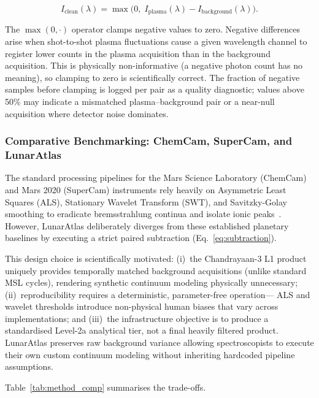 \documentclass[a4paper,twocolumn,10pt]{article}
\begin{document}
\begin{equation}
\label{eq:subtraction}
I_{\text{clean}}(\lambda) =
  \max\!\bigl(0,\;
  I_{\text{plasma}}(\lambda) - I_{\text{background}}(\lambda)
  \bigr).
\end{equation}

The $\max(0, \cdot)$ operator clamps negative values to zero.
Negative differences arise when shot-to-shot plasma fluctuations cause
a given wavelength channel to register lower counts in the plasma
acquisition than in the background acquisition.  This is physically
non-informative (a negative photon count has no meaning), so clamping
to zero is scientifically correct.  The fraction of negative samples
before clamping is logged per pair as a quality diagnostic; values
above 50\% may indicate a mismatched plasma--background pair or
a near-null acquisition where detector noise dominates.

\subsubsection{Comparative Benchmarking: ChemCam, SuperCam, and LunarAtlas}

The standard processing pipelines for the Mars Science Laboratory (ChemCam) and 
Mars 2020 (SuperCam) instruments rely heavily on Asymmetric Least Squares (ALS), 
Stationary Wavelet Transform (SWT), and Savitzky-Golay smoothing to eradicate 
bremsstrahlung continua and isolate ionic peaks~\cite{Clegg2017,Anderson2022,Sridhar2025}. 
However, LunarAtlas deliberately diverges from these established planetary baselines
by executing a strict paired subtraction (Eq.~\ref{eq:subtraction}).

This design choice is scientifically motivated:
(i)~the Chandrayaan-3 L1 product uniquely provides temporally matched background
acquisitions (unlike standard MSL cycles), rendering synthetic continuum modeling physically unnecessary;
(ii)~reproducibility requires a deterministic, parameter-free operation---
ALS and wavelet thresholds introduce non-physical human biases that vary across
implementations; and (iii)~the infrastructure objective is to produce a
standardised Level-2a analytical tier, not a final heavily filtered product. 
LunarAtlas preserves raw background variance allowing spectroscopists to execute
their own custom continuum modeling without inheriting hardcoded pipeline assumptions.

Table~\ref{tab:method_comp} summarises the trade-offs.
\end{document}
